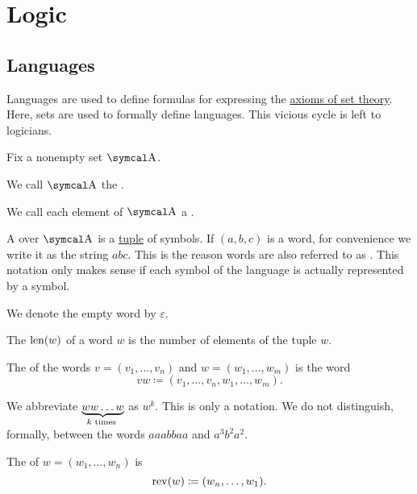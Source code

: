 \section{Logic}\label{sec:logic}
\subsection{Languages}\label{subsec:languages}

\begin{remark}\label{remark:language_definitions_using_sets}
  Languages are used to define formulas for expressing the \hyperref[def:set_zfc]{axioms of set theory}. Here, sets are used to formally define languages. This vicious cycle is left to logicians.
\end{remark}

\begin{definition}\label{def:language}
  Fix a nonempty set \( \CA \).

  \begin{DefEnum}
     We call \( \CA \) the .

     We call each element of \( \CA \) a .

     A  over \( \CA \) is a \hyperref[def:cartesian_product]{tuple} of symbols. If \( (a, b, c) \) is a word, for convenience we write it as the string \( abc \). This is the reason words are also referred to as . This notation only makes sense if each symbol of the language is actually represented by a symbol.

     We denote the empty word by \( \varepsilon \).

     The  \( \operatorname{len}(w) \) of a word \( w \) is the number of elements of the tuple \( w \).

     The  of the words \( v = (v_1, \ldots, v_n) \) and \( w = (w_1, \ldots, w_m) \) is the word
    \begin{equation*}
      vw \coloneqq (v_1, \ldots, v_n, w_1, \ldots, w_m).
    \end{equation*}

    We abbreviate \( \underbrace{w w \ldots w}_{k \text{ times }} \) as \( w^k \). This is only a notation. We do not distinguish, formally, between the words \( aaabbaa \) and \( a^3 b^2 a^2 \).

     The  of \( w = (w_1, \ldots, w_n) \) is
    \begin{equation*}
      \operatorname{rev}(w) \coloneqq (w_n, \ldots, w_1).
    \end{equation*}


\end{DefEnum}
\end{definition}
